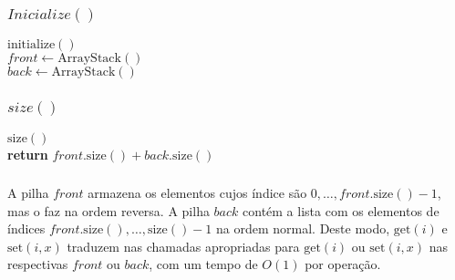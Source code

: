 \documentclass{beamer}
\begin{document}
\begin{frame}
\frametitle{$Inicialize()$}
\begin{oframed}
\begin{flushleft}
\hspace*{1em} $\ensuremath{\mathrm{initialize}()}$\\
\hspace*{1em} \hspace*{1em} $\ensuremath{\ensuremath{\mathit{front}} \gets  \ensuremath{\mathrm{\mathrm{ArrayStack}}()}}$\\
\hspace*{1em} \hspace*{1em} $\ensuremath{\ensuremath{\mathit{back}} \gets  \ensuremath{\mathrm{\mathrm{ArrayStack}}()}}$\\
\end{flushleft}
\end{oframed}
\end{frame}

\begin{frame}
\frametitle{$size()$}
\begin{oframed}
\begin{flushleft}
\hspace*{1em} $\ensuremath{\mathrm{size}()}$\\
\hspace*{1em} \hspace*{1em} {\color{black} \textbf{return}} $\ensuremath{\ensuremath{\mathit{front}}.\mathrm{size}() + \ensuremath{\mathit{back}}.\mathrm{size}()}$\\
\end{flushleft}
\end{oframed}
\end{frame}

\begin{frame}
\frametitle{}
A pilha $front$ armazena os elementos cujos índice são $0,\ldots,\ensuremath{\ensuremath{\ensuremath{\mathit{front}}.\mathrm{size}()}}-1$, mas o faz na ordem reversa.
A pilha $back$ contém a lista com os elementos de índices $\ensuremath{\ensuremath{\ensuremath{\mathit{front}}.\mathrm{size}()}},\ldots,\ensuremath{\ensuremath{\mathrm{size}()}}-1$ na ordem normal.  Deste modo,
$\ensuremath{\ensuremath{\mathrm{get}(\ensuremath{\mathit{i}})}}$ e $\ensuremath{\ensuremath{\mathrm{set}(\ensuremath{\mathit{i}},\ensuremath{\mathit{x}})}}$ traduzem nas chamadas apropriadas para $\ensuremath{\ensuremath{\mathrm{get}(\ensuremath{\mathit{i}})}}$
ou $\ensuremath{\ensuremath{\mathrm{set}(\ensuremath{\mathit{i}},\ensuremath{\mathit{x}})}}$ nas respectivas $\ensuremath{\ensuremath{\ensuremath{\mathit{front}}}}$ ou $\ensuremath{\ensuremath{\ensuremath{\mathit{back}}}}$, com um tempo de $O(1)$ por operação.
\end{frame}
\end{document}
